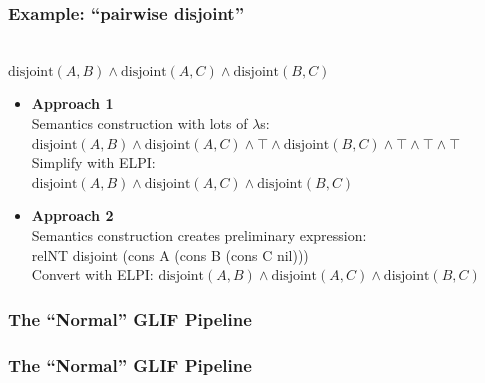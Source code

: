 \documentclass[aspectratio=169]{beamer}
\begin{document}
\begin{frame}
    \frametitle{Example: ``pairwise disjoint''}
    \newcommand\ds{\text{disjoint}}
    \\
    {\color{logicfont} $\ds(A,B) \wedge \ds(A,C) \wedge \ds(B,C)$}
    \vspace{1em}

    \begin{itemize}
        \item \textbf{Approach 1}\\Semantics construction with lots of $\lambda$s:
            {\hspace{2em}\color{logicfont} $\ds(A,B) \wedge \ds(A,C) \wedge \top \wedge \ds(B,C) \wedge \top \wedge \top\wedge\top$}\\
                Simplify with ELPI:\\
            {\hspace{2em}\color{logicfont} $\ds(A,B) \wedge \ds(A,C) \wedge \ds(B,C)$}
        \pause
        \item \textbf{Approach 2}\\Semantics construction creates preliminary expression:\\
            {\hspace{2em}\color{logicfont}\ttfamily relNT disjoint (cons A (cons B (cons C nil))) }\\
                Convert with ELPI:
            {\hspace{2em}\color{logicfont} $\ds(A,B) \wedge \ds(A,C) \wedge \ds(B,C)$}
    \end{itemize}
\end{frame}

\begin{frame}
    \frametitle{The ``Normal'' GLIF Pipeline}
    
\end{frame}









\begin{frame}
    \frametitle{The ``Normal'' GLIF Pipeline}
    
\end{frame}
\end{document}
